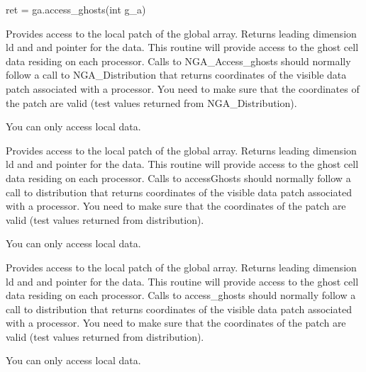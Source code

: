 \documentclass[12pt]{article}
\begin{document}
\begin{pyapi}
\begin{pycode}
ret = ga.access_ghosts(int g_a)
\end{pycode}
\begin{funcargs}
\end{funcargs}
\end{pyapi}

\local

\begin{cdesc}
Provides access to the local patch of the global array. Returns leading
dimension ld and and pointer for the data.  This routine will provide access to
the ghost cell data residing on each processor. Calls to NGA_Access_ghosts
should normally follow a call to NGA_Distribution that returns coordinates of
the visible data patch associated with a processor. You need to make sure that
the coordinates of the patch are valid (test values returned from
NGA_Distribution).

You can only access local data.
\end{cdesc}

\begin{cxxdesc}
Provides access to the local patch of the global array. Returns leading
dimension ld and and pointer for the data.  This routine will provide access to
the ghost cell data residing on each processor. Calls to accessGhosts
should normally follow a call to distribution that returns coordinates of
the visible data patch associated with a processor. You need to make sure that
the coordinates of the patch are valid (test values returned from
distribution).

You can only access local data.
\end{cxxdesc}

\begin{pydesc}
Provides access to the local patch of the global array. Returns leading
dimension ld and and pointer for the data.  This routine will provide access to
the ghost cell data residing on each processor. Calls to access_ghosts
should normally follow a call to distribution that returns coordinates of
the visible data patch associated with a processor. You need to make sure that
the coordinates of the patch are valid (test values returned from
distribution).

You can only access local data.
\end{pydesc}
\end{document}

